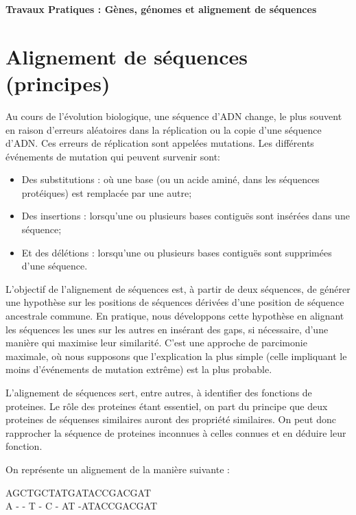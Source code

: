 \documentclass{article}
\begin{document}
  \centering        
    \vfill
    
       {\LARGE \textbf{Travaux Pratiques : Gènes, génomes et alignement de séquences}} \\[1in]
    
    \justifying
     
  \section{Alignement de séquences (principes)}
  
  Au cours de l'évolution biologique, une séquence d'ADN change, le plus souvent en raison d'erreurs aléatoires dans la réplication ou la copie d'une séquence d'ADN. Ces erreurs de réplication sont appelées mutations. Les différents événements de mutation qui peuvent survenir sont:
  \begin{itemize}
  \item Des substitutions : où une base (ou un acide aminé, dans les séquences protéiques) est remplacée par une autre;
  \item Des insertions : lorsqu'une ou plusieurs bases contiguës sont insérées dans une séquence;
  \item Et des délétions : lorsqu'une ou plusieurs bases contiguës sont supprimées d'une séquence.
  \end{itemize}
  
L'objectif de l'alignement de séquences est, à partir de deux séquences, de générer une hypothèse sur les positions de séquences dérivées d'une position de séquence ancestrale commune. En pratique, nous développons cette hypothèse en alignant les séquences les unes sur les autres en insérant des gaps, si nécessaire, d'une manière qui maximise leur similarité. C'est une approche de parcimonie maximale, où nous supposons que l'explication la plus simple (celle impliquant le moins d'événements de mutation extrême) est la plus probable.

L'alignement de séquences sert, entre autres, à identifier des fonctions de proteines. Le rôle des proteines étant essentiel, on part du principe que deux proteines de séquenses similaires auront des propriété similaires. On peut donc rapprocher la séquence de proteines inconnues à celles connues et en déduire leur fonction.

On représente un alignement de la manière suivante :
\begin{center}
 AGCTGCTATGATACCGACGAT\\
A - - T - C - AT -ATACCGACGAT  
\end{center}
\end{document}

